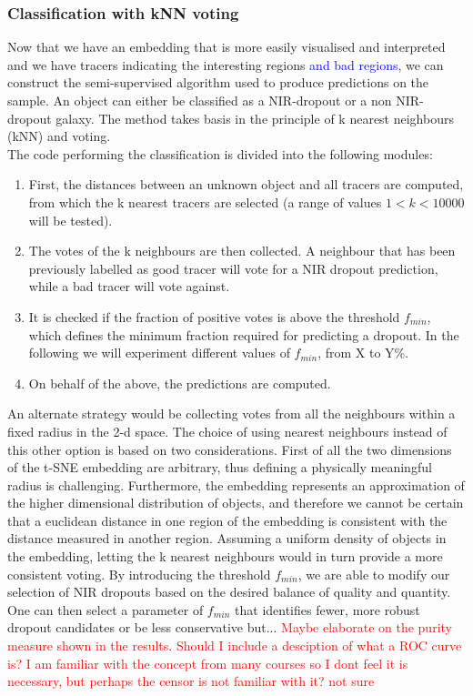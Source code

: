\subsubsection{Classification with kNN voting}
Now that we have an embedding that is more easily visualised and interpreted and we have tracers indicating the interesting regions \textcolor{blue}{and bad regions}, we can construct the semi-supervised algorithm used to produce predictions on the sample. An object can either be classified as a NIR-dropout or a non NIR-dropout galaxy. The method takes basis in the principle of k nearest neighbours (kNN) and voting. \\
The code performing the classification is divided into the following modules:
\begin{enumerate}
    \item First, the distances between an unknown object and all tracers are computed, from which the k nearest tracers are selected (a range of values $1<k<10000$ will be tested).
    \item The votes of the k neighbours are then collected. A neighbour that has been previously labelled as good tracer  will vote for a NIR dropout prediction, while a bad tracer will vote against.
    \item It is checked if the fraction of positive votes  is above the threshold $f_{min}$, which defines the minimum fraction  required for predicting a dropout. In the following we will experiment different values of $f_{min}$, from X to Y\%. 
    \item On behalf of the above, the predictions are computed.
\end{enumerate}
An alternate strategy would be collecting votes from all the neighbours within a fixed radius in the 2-d space. 
The choice of using nearest neighbours instead of this other option  is based on two considerations. First of all the two dimensions of the t-SNE embedding are arbitrary, thus defining a physically meaningful radius is challenging. Furthermore, the embedding represents an approximation of the higher dimensional distribution of objects, and therefore we cannot be certain that a euclidean distance in one region of the embedding is consistent with the distance measured in another region. Assuming a uniform density of objects in the embedding, letting the k nearest neighbours would in turn provide a more consistent voting. By introducing the threshold $f_{min}$, we are able to modify our selection of NIR dropouts based on the desired balance of quality and quantity. One can then select a parameter of $f_{min}$ that identifies fewer, more robust dropout candidates or be less conservative but... \textcolor{red}{Maybe elaborate on the purity measure shown in the results}.
\textcolor{red}{Should I include a desciption of what a ROC curve is? I am familiar with the concept from many courses so I dont feel it is necessary, but perhaps the censor is not familiar with it? not sure}
